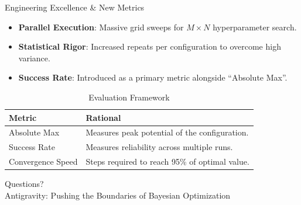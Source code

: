 \documentclass[10pt, aspectratio=169]{beamer}
\begin{document}
\begin{frame}{Engineering Excellence \& New Metrics}
    \begin{itemize}
        \item \textbf{Parallel Execution}: Massive grid sweeps for $M \times N$ hyperparameter search.
        \item \textbf{Statistical Rigor}: Increased repeats per configuration to overcome high variance.
        \item \textbf{Success Rate}: Introduced as a primary metric alongside ``Absolute Max''.
    \end{itemize}
    
    \begin{table}[]
        \centering
        \caption{Evaluation Framework}
        \begin{tabular}{@{}ll@{}}
        \toprule
        \textbf{Metric} & \textbf{Rational} \\ \midrule
        Absolute Max & Measures peak potential of the configuration. \\
        Success Rate & Measures reliability across multiple runs. \\
        Convergence Speed & Steps required to reach 95\% of optimal value. \\ \bottomrule
        \end{tabular}
    \end{table}
\end{frame}

\begin{frame}[standout]
    Questions? \\
    \vspace{0.5cm}
    \small{Antigravity: Pushing the Boundaries of Bayesian Optimization}
\end{frame}
\end{document}
